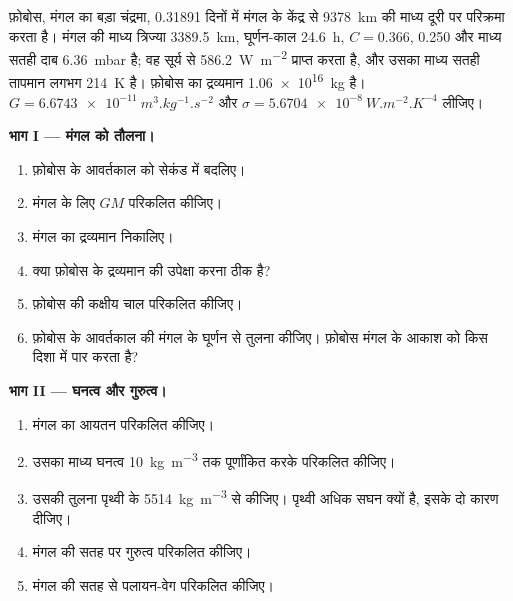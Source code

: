\begin{problem}
\label{pb:b1:comparative-planetology:1}
फ़ोबोस, मंगल का बड़ा चंद्रमा, \num{0.31891} दिनों में मंगल के केंद्र से \qty{9378}{km} की माध्य दूरी पर
परिक्रमा करता है। मंगल की माध्य त्रिज्या \qty{3389.5}{km}, घूर्णन-काल \qty{24.6}{h}, 
$C = 0.366$,  0.250 और माध्य सतही दाब \qty{6.36}{mbar} है; वह सूर्य से \qty{586.2}{W.m^{-2}}
प्राप्त करता है, और उसका माध्य सतही तापमान लगभग \qty{214}{K} है। फ़ोबोस का द्रव्यमान
\qty{1.06e16}{kg} है। $G = \qty{6.6743e-11}{m^3.kg^{-1}.s^{-2}}$ और
$\sigma = \qty{5.6704e-8}{W.m^{-2}.K^{-4}}$ लीजिए।

\medskip
\noindent\textbf{भाग I --- मंगल को तौलना।}
\begin{enumerate}
  \item फ़ोबोस के आवर्तकाल को सेकंड में बदलिए।
  \item मंगल के लिए $GM$ परिकलित कीजिए।
  \item मंगल का द्रव्यमान निकालिए।
  \item क्या फ़ोबोस के द्रव्यमान की उपेक्षा करना ठीक है?
  \item फ़ोबोस की कक्षीय चाल परिकलित कीजिए।
  \item फ़ोबोस के आवर्तकाल की मंगल के घूर्णन से तुलना कीजिए। फ़ोबोस मंगल के आकाश को किस दिशा में पार करता है?
\end{enumerate}

\medskip
\noindent\textbf{भाग II --- घनत्व और गुरुत्व।}
\begin{enumerate}[resume]
  \item मंगल का आयतन परिकलित कीजिए।
  \item उसका माध्य घनत्व \qty{10}{kg.m^{-3}} तक पूर्णांकित करके परिकलित कीजिए।
  \item उसकी तुलना पृथ्वी के \qty{5514}{kg.m^{-3}} से कीजिए। पृथ्वी अधिक सघन क्यों है, इसके दो कारण दीजिए।
  \item मंगल की सतह पर गुरुत्व परिकलित कीजिए।
  \item मंगल की सतह से पलायन-वेग परिकलित कीजिए।
\end{enumerate}


\end{problem}
